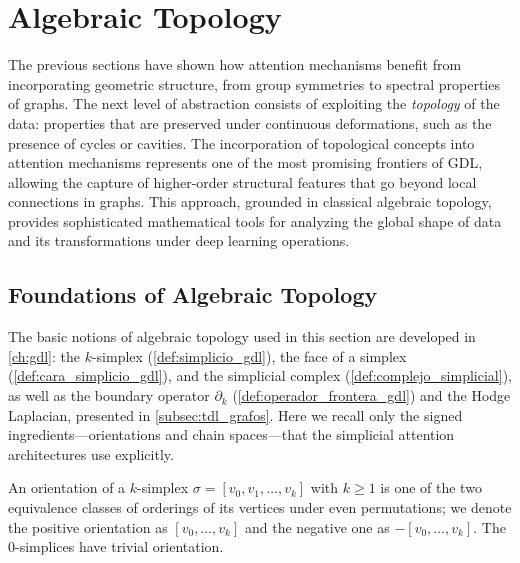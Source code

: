 \section{Algebraic Topology}

The previous sections have shown how attention mechanisms benefit from incorporating geometric structure, from group symmetries to spectral properties of graphs. The next level of abstraction consists of exploiting the \textit{topology} of the data: properties that are preserved under continuous deformations, such as the presence of cycles or cavities. The incorporation of topological concepts into attention mechanisms represents one of the most promising frontiers of \gls{GDL}, allowing the capture of higher-order structural features that go beyond local connections in graphs. This approach, grounded in classical algebraic topology, provides sophisticated mathematical tools for analyzing the global shape of data and its transformations under deep learning operations.

\subsection{Foundations of Algebraic Topology}

The basic notions of algebraic topology used in this section are developed in \autoref{ch:gdl}: the $k$-simplex (\autoref{def:simplicio_gdl}), the face of a simplex (\autoref{def:cara_simplicio_gdl}), and the simplicial complex (\autoref{def:complejo_simplicial}), as well as the boundary operator $\partial_k$ (\autoref{def:operador_frontera_gdl}) and the Hodge Laplacian, presented in \autoref{subsec:tdl_grafos}. Here we recall only the signed ingredients---orientations and chain spaces---that the simplicial attention architectures use explicitly.

\begin{definition}\label{def:orientacion_simplicio}
An orientation of a $k$-simplex $\sigma = [v_0, v_1, \ldots, v_k]$ with $k \geq 1$ is one of the two equivalence classes of orderings of its vertices under even permutations; we denote the positive orientation as $[v_0, \ldots, v_k]$ and the negative one as $-[v_0, \ldots, v_k]$. The 0-simplices have trivial orientation.
\end{definition}

